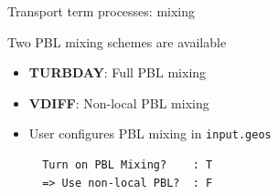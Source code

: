\documentclass[10pt]{beamer}
\begin{document}
\begin{frame}[fragile]{Transport term processes: mixing}
\begin{minipage}[c]{0.6\textwidth}
\begin{itemize}
        \end{itemize}
        \vspace{0.5cm}
        Two PBL mixing schemes are available
        \begin{itemize}
            \item \textbf{TURBDAY}: Full PBL mixing
            \item \textbf{VDIFF}: Non-local PBL mixing
            \item User configures PBL mixing in \texttt{input.geos}
            \begin{verbatim}
  Turn on PBL Mixing?    : T
  => Use non-local PBL?  : F
            \end{verbatim}
        \end{itemize}
    \end{minipage}
\end{frame}
\end{document}
